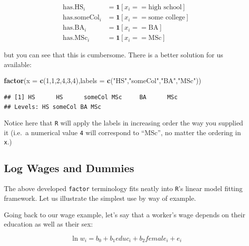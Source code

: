 \documentclass[]{book}
\newenvironment{Shaded}{\begin{snugshade}}{\end{snugshade}}
\newcommand{\KeywordTok}[1]{\textcolor[rgb]{0.13,0.29,0.53}{\textbf{#1}}}
\newcommand{\DataTypeTok}[1]{\textcolor[rgb]{0.13,0.29,0.53}{#1}}
\newcommand{\DecValTok}[1]{\textcolor[rgb]{0.00,0.00,0.81}{#1}}
\newcommand{\StringTok}[1]{\textcolor[rgb]{0.31,0.60,0.02}{#1}}
\newcommand{\NormalTok}[1]{#1}
\begin{document}
\begin{align*}
\text{has.HS}_i &= \mathbf{1}[x_i==\text{high school}] \\
\text{has.someCol}_i &= \mathbf{1}[x_i==\text{some college}] \\
\text{has.BA}_i &= \mathbf{1}[x_i==\text{BA}] \\
\text{has.MSc}_i &= \mathbf{1}[x_i==\text{MSc}] 
\end{align*}

but you can see that this is cumbersome. There is a better solution for
us available:

\begin{Shaded}
\begin{Highlighting}[]
\KeywordTok{factor}\NormalTok{(}\DataTypeTok{x =} \KeywordTok{c}\NormalTok{(}\DecValTok{1}\NormalTok{,}\DecValTok{1}\NormalTok{,}\DecValTok{2}\NormalTok{,}\DecValTok{4}\NormalTok{,}\DecValTok{3}\NormalTok{,}\DecValTok{4}\NormalTok{),}\DataTypeTok{labels =} \KeywordTok{c}\NormalTok{(}\StringTok{"HS"}\NormalTok{,}\StringTok{"someCol"}\NormalTok{,}\StringTok{"BA"}\NormalTok{,}\StringTok{"MSc"}\NormalTok{))}
\end{Highlighting}
\end{Shaded}

\begin{verbatim}
## [1] HS      HS      someCol MSc     BA      MSc    
## Levels: HS someCol BA MSc
\end{verbatim}

Notice here that \texttt{R} will apply the labels in increasing order
the way you supplied it (i.e.~a numerical value \texttt{4} will
correspond to ``MSc'', no matter the ordering in \texttt{x}.)

\subsection{Log Wages and Dummies}\label{factors}

The above developed \texttt{factor} terminology fits neatly into
\texttt{R}'s linear model fitting framework. Let us illustrate the
simplest use by way of example.

Going back to our wage example, let's say that a worker's wage depends
on their education as well as their sex:

\begin{equation}
\ln w_i = b_0 + b_1 educ_i + b_2 female_i + e_i \label{eq:wage-sex}
\end{equation}
\end{document}
